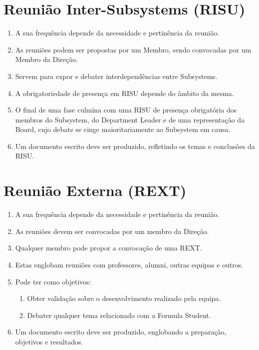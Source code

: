 \section{Reunião Inter-Subsystems (RISU)}
\begin{enumerate}
  \item A sua frequência depende da necessidade e pertinência da reunião.
  \item As reuniões podem ser propostas por um Membro, sendo convocadas por um Membro da Direção.
  \item Servem para expor e debater interdependências entre Subsystems.
  \item A obrigatoriedade de presença em RISU depende do âmbito da mesma.
  \item O final de uma fase culmina com uma RISU de presença obrigatória dos membros do Subsystem, do Department Leader e de uma representação da Board, cujo debate se cinge maioritariamente ao Subsystem em causa.
  \item Um documento escrito deve ser produzido, refletindo os temas e conclusões da RISU.
\end{enumerate}

\section{Reunião Externa (REXT)}
\begin{enumerate}
  \item A sua frequência depende da necessidade e pertinência da reunião.
  \item As reuniões devem ser convocadas por um membro da Direção.
  \item Qualquer membro pode propor a convocação de uma REXT.
  \item Estas englobam reuniões com professores, alumni, outras equipas e outros.
  \item Pode ter como objetivos:
  \begin{enumerate}
    \item Obter validação sobre o desenvolvimento realizado pela equipa.
    \item Debater qualquer tema relacionado com a Formula Student.
  \end{enumerate}
  \item Um documento escrito deve ser produzido, englobando a preparação, objetivos e resultados.
\end{enumerate}

